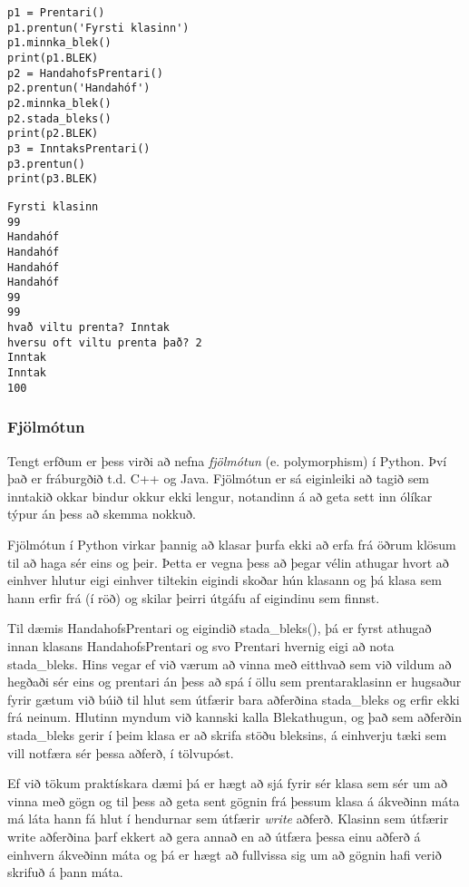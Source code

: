 \begin{lstlisting}[caption=Prentaraklasarnir notaðir, label=lst:klasar-erfðir-2]
p1 = Prentari()
p1.prentun('Fyrsti klasinn')
p1.minnka_blek()
print(p1.BLEK)
p2 = HandahofsPrentari()
p2.prentun('Handahóf')
p2.minnka_blek()
p2.stada_bleks()
print(p2.BLEK)
p3 = InntaksPrentari()
p3.prentun()
print(p3.BLEK)
\end{lstlisting}
\lstset{style=uttak}
\begin{lstlisting}
Fyrsti klasinn
99
Handahóf
Handahóf
Handahóf
Handahóf
99
99
hvað viltu prenta? Inntak
hversu oft viltu prenta það? 2
Inntak
Inntak
100
\end{lstlisting}
\lstset{style=venjulegt}


\subsubsection{Fjölmótun}
Tengt erfðum er þess virði að nefna \emph{fjölmótun} (e. polymorphism) í Python.
Því það er fráburgðið t.d. C++ og Java.
Fjölmótun er sá eiginleiki að tagið sem inntakið okkar bindur okkur ekki lengur, notandinn á að geta sett inn ólíkar týpur án þess að skemma nokkuð.

Fjölmótun í Python virkar þannig að klasar þurfa ekki að erfa frá öðrum klösum til að haga sér eins og þeir.
Þetta er vegna þess að þegar vélin athugar hvort að einhver hlutur eigi einhver tiltekin eigindi skoðar hún klasann og þá klasa sem hann erfir frá (í röð) og skilar þeirri útgáfu af eigindinu sem finnst.

Til dæmis HandahofsPrentari og eigindið stada\_bleks(), þá er fyrst athugað innan klasans HandahofsPrentari og svo Prentari hvernig eigi að nota stada\_bleks.
Hins vegar ef við værum að vinna með eitthvað sem við vildum að hegðaði sér eins og prentari án þess að spá í öllu sem prentaraklasinn er hugsaður fyrir gætum við búið til hlut sem útfærir bara aðferðina stada\_bleks og erfir ekki frá neinum.
Hlutinn myndum við kannski kalla Blekathugun, og það sem aðferðin stada\_bleks gerir í þeim klasa er að skrifa stöðu bleksins, á einhverju tæki sem vill notfæra sér þessa aðferð, í tölvupóst.

Ef við tökum praktískara dæmi þá er hægt að sjá fyrir sér klasa sem sér um að vinna með gögn og til þess að geta sent gögnin frá þessum klasa á ákveðinn máta má láta hann fá hlut í hendurnar sem útfærir \textit{write} aðferð.
Klasinn sem útfærir write aðferðina þarf ekkert að gera annað en að útfæra þessa einu aðferð á einhvern ákveðinn máta og þá er hægt að fullvissa sig um að gögnin hafi verið skrifuð á þann máta.

